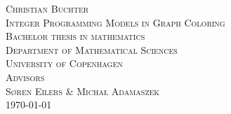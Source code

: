 \clearpage
\thispagestyle{empty}

\begin{titlingpage}
	\vspace*{5.5cm}
	\noindent
	{\large\textsc{Christian Buchter}}\\[0.5cm]
	{\large\textsc{Integer Programming Models in Graph Coloring}}\\[0.1cm]
	\vfill\noindent
	{\large\textsc{Bachelor thesis in mathematics}}\\[0.2cm]
	\noindent
	{\large\textsc{Department of Mathematical Sciences}}\\[0.2cm]
	\noindent
	{\large\textsc{University of Copenhagen}}\\[1cm]
	{\large\textsc{Advisors \\[0.2cm] {\Large Søren Eilers \& Micha\l{} Adamaszek}}}\\[1cm]
	{\large\textsc{\today}}
	\let\cleardoublepage\clearpage
\end{titlingpage}
\normalfont
\restoregeometry
\cleardoublepage